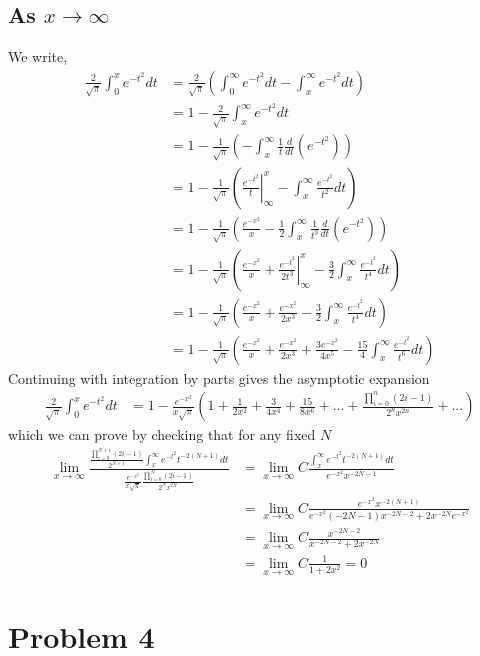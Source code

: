\documentclass[12pt]{article}
\newcommand{\eq}[1]{\begin{align*}#1\end{align*}}
\begin{document}
\subsection*{As $x\rightarrow\infty$} We write,
\eq{
	\frac{2}{\sqrt{\pi}}\int_0^x e^{-t^2}dt &= \frac{2}{\sqrt{\pi}}\left(\int_0^\infty e^{-t^2}dt - \int_x^\infty e^{-t^2}dt\right)\\
	&= 1 - \frac{2}{\sqrt{\pi}}\int_x^\infty e^{-t^2}dt\\
	&= 1 - \frac{1}{\sqrt{\pi}}\left(-\int_x^\infty\frac{1}{t} \frac{d}{dt}\left(e^{-t^2}\right)\right)\\
	&= 1 - \frac{1}{\sqrt{\pi}}\left(\left. \frac{e^{-t^2}}{t}\right|_\infty^x - \int_x^\infty \frac{e^{-t^2}}{t^2} dt\right)\\
	&= 1 - \frac{1}{\sqrt{\pi}}\left(\frac{e^{-x^2}}{x} - \frac{1}{2}\int_x^\infty \frac{1}{t^3} \frac{d}{dt}\left(e^{-t^2}\right)\right)\\
	&= 1 - \frac{1}{\sqrt{\pi}}\left(\frac{e^{-x^2}}{x} + \left.\frac{e^{-t^2}}{2t^3}\right|_\infty^x - \frac{3}{2}\int_x^\infty \frac{e^{-t^2}}{t^4} dt\right)\\
	&= 1 - \frac{1}{\sqrt{\pi}}\left(\frac{e^{-x^2}}{x} + \frac{e^{-x^2}}{2x^3} - \frac{3}{2}\int_x^\infty \frac{e^{-t^2}}{t^4} dt\right)\\
	&= 1 - \frac{1}{\sqrt{\pi}}\left(\frac{e^{-x^2}}{x} + \frac{e^{-x^2}}{2x^3} + \frac{3e^{-x^2}}{4x^5} - \frac{15}{4}\int_x^\infty \frac{e^{-t^2}}{t^6} dt\right)
}
Continuing with integration by parts gives the asymptotic expansion
\eq{
	\frac{2}{\sqrt{\pi}}\int_0^x e^{-t^2}dt &= 1 - \frac{e^{-x^2}}{x\sqrt{\pi}}\left(1 + \frac{1}{2x^2} + \frac{3}{4x^4} + \frac{15}{8x^6} + ... + \frac{\prod_{i=0}^n(2i-1)}{2^n x^{2n}} + ...\right)
}
which we can prove by checking that for any fixed $N$
\eq{
	\lim_{x\rightarrow\infty} \frac{\frac{\prod_{i=0}^{N+1}(2i-1)}{2^{N+1}}\int_x^\infty e^{-t^2}{t^{-2(N+1)} dt}}{\frac{e^{-x^2}}{x\sqrt{\pi}}\frac{\prod_{i=0}^N(2i-1)}{2^N x^{2N}}} &= \lim_{x\rightarrow\infty} C\frac{\int_x^\infty e^{-t^2} t^{-2(N+1)}dt} {e^{-x^2}x^{-2N-1}}\\
	&= \lim_{x\rightarrow\infty} C\frac{e^{-x^2}x^{-2(N+1)}}{ e^{-x^2}(-2N-1)x^{-2N-2} + 2x^{-2N}e^{-x^2} }\\
	&= \lim_{x\rightarrow\infty} C\frac{x^{-2N-2}}{x^{-2N-2} + 2x^{-2N}}\\
	&= \lim_{x\rightarrow\infty} C\frac{1}{1+2x^2} = 0
}
\section*{Problem 4}
\end{document}
